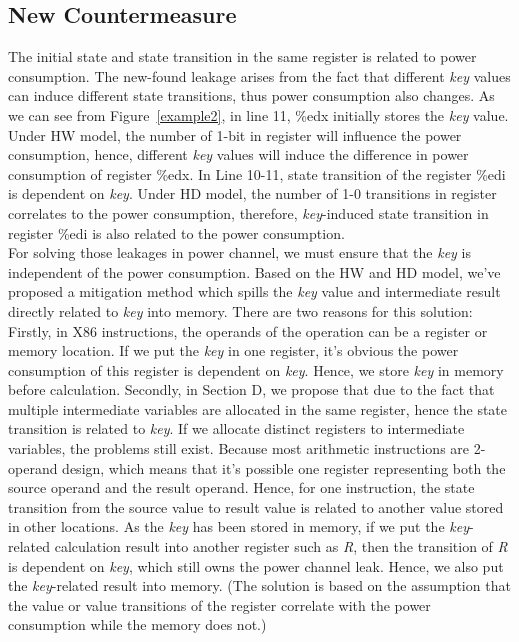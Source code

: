 \documentclass[10pt, conference]{IEEEtran}
\begin{document}
\subsection{New Countermeasure}
The initial state and state transition in the same register is related to power consumption. The new-found leakage arises from the fact that different \emph{key} values can induce different state transitions, thus power consumption also changes. As we can see from Figure~\ref{example2}, in line 11, \%edx initially stores the \emph{key} value. Under HW model, the number of 1-bit in register will influence the power consumption, hence, different \emph{key} values will induce the difference in power consumption of register \%edx. In Line 10-11, state transition of the register \%edi is dependent on \emph{key}. Under HD model, the number of 1-0 transitions in register correlates to the power consumption, therefore, \emph{key}-induced state transition in register \%edi is also related to the power consumption.
\\
For solving those leakages in power channel, we must ensure that the \emph{key} is independent of the power consumption. Based on the HW and HD model, we've proposed a mitigation method which spills the \emph{key} value and intermediate result directly related to \emph{key} into memory. There are two reasons for this solution: Firstly, in X86 instructions, the operands of the operation can be a register or memory location. If we put the \emph{key} in one register, it's obvious the power consumption of this register is dependent on \emph{key}. Hence, we store \emph{key} in memory before calculation. Secondly, in Section D, we propose that due to the fact that multiple intermediate variables are allocated in the same register, hence the state transition is related to \emph{key}. If we allocate distinct registers to intermediate variables, the problems still exist. Because most arithmetic instructions are 2-operand design, which means that it's possible one register representing both the source operand and the result operand. Hence, for one instruction, the state transition from the source value to result value is related to another value stored in other locations. As the \emph{key} has been stored in memory, if we put the \emph{key}-related calculation result into another register such as \emph{R}, then the transition of \emph{R} is dependent on \emph{key}, which still owns the power channel leak. Hence, we also put the \emph{key}-related result into memory. (The solution is based on the assumption that the value or value transitions of the register correlate with the power consumption while the memory does not.) \\
\end{document}
